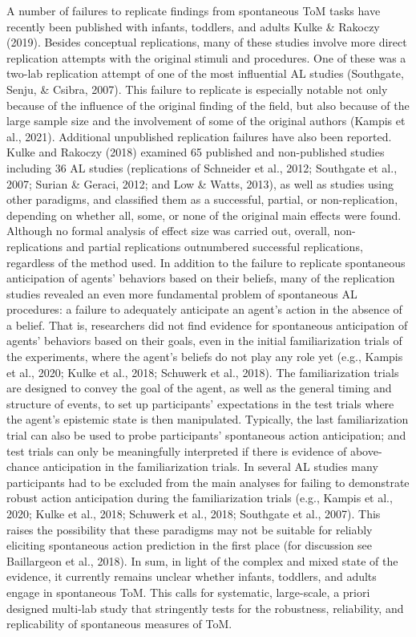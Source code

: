 \documentclass[
  english,
  man,floatsintext]{apa6}
\begin{document}
A number of failures to replicate findings from spontaneous ToM tasks have recently been published with infants, toddlers, and adults Kulke \& Rakoczy (2019). Besides conceptual replications, many of these studies involve more direct replication attempts with the original stimuli and procedures. One of these was a two-lab replication attempt of one of the most influential AL studies (Southgate, Senju, \& Csibra, 2007). This failure to replicate is especially notable not only because of the influence of the original finding of the field, but also because of the large sample size and the involvement of some of the original authors (Kampis et al., 2021). Additional unpublished replication failures have also been reported. Kulke and Rakoczy (2018) examined 65 published and non-published studies including 36 AL studies (replications of Schneider et al., 2012; Southgate et al., 2007; Surian \& Geraci, 2012; and Low \& Watts, 2013), as well as studies using other paradigms, and classified them as a successful, partial, or non-replication, depending on whether all, some, or none of the original main effects were found. Although no formal analysis of effect size was carried out, overall, non-replications and partial replications outnumbered successful replications, regardless of the method used.
In addition to the failure to replicate spontaneous anticipation of agents' behaviors based on their beliefs, many of the replication studies revealed an even more fundamental problem of spontaneous AL procedures: a failure to adequately anticipate an agent's action in the absence of a belief. That is, researchers did not find evidence for spontaneous anticipation of agents' behaviors based on their goals, even in the initial familiarization trials of the experiments, where the agent's beliefs do not play any role yet (e.g., Kampis et al., 2020; Kulke et al., 2018; Schuwerk et al., 2018). The familiarization trials are designed to convey the goal of the agent, as well as the general timing and structure of events, to set up participants' expectations in the test trials where the agent's epistemic state is then manipulated. Typically, the last familiarization trial can also be used to probe participants' spontaneous action anticipation; and test trials can only be meaningfully interpreted if there is evidence of above-chance anticipation in the familiarization trials. In several AL studies many participants had to be excluded from the main analyses for failing to demonstrate robust action anticipation during the familiarization trials (e.g., Kampis et al., 2020; Kulke et al., 2018; Schuwerk et al., 2018; Southgate et al., 2007). This raises the possibility that these paradigms may not be suitable for reliably eliciting spontaneous action prediction in the first place (for discussion see Baillargeon et al., 2018).
In sum, in light of the complex and mixed state of the evidence, it currently remains unclear whether infants, toddlers, and adults engage in spontaneous ToM. This calls for systematic, large-scale, a priori designed multi-lab study that stringently tests for the robustness, reliability, and replicability of spontaneous measures of ToM.
\end{document}
